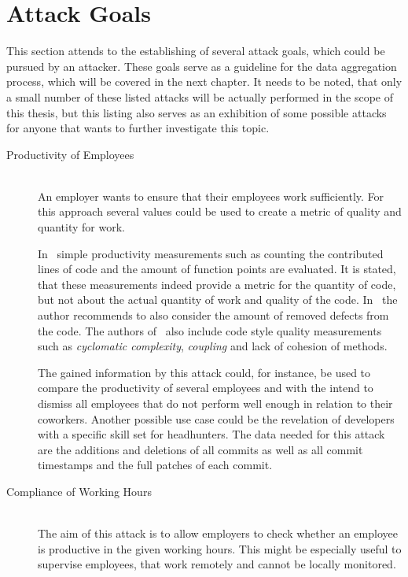 \section{Attack Goals}\label{attack-goals}
This section attends to the establishing of several attack goals, which could be pursued by an attacker.
These goals serve as a guideline for the data aggregation process, which will be covered in the next chapter.
It needs to be noted, that only a small number of these listed attacks will be actually performed in the scope of this thesis, but this listing also serves as an exhibition of some possible attacks for anyone that wants to further investigate this topic.

\begin{description}
    \item[Productivity of Employees] \hfill \\
        An employer wants to ensure that their employees work sufficiently.
        For this approach several values could be used to create a metric of quality and quantity for work.

        In~\cite[p.~3]{article:job-productivity} simple productivity measurements such as counting the contributed lines of code and the amount of function points are evaluated.
        It is stated, that these measurements indeed provide a metric for the quantity of code, but not about the actual quantity of work and quality of the code.
        In~\cite[p.~43]{article:measuring-programming-quality} the author recommends to also consider the amount of removed defects from the code.
        The authors of~\cite[p.~257]{article:software-productivity} also include code style quality measurements such as \emph{cyclomatic complexity}, \emph{coupling} and lack of cohesion of methods.

        The gained information by this attack could, for instance, be used to compare the productivity of several employees and with the intend to dismiss all employees that do not perform well enough in relation to their coworkers.
        Another possible use case could be the revelation of developers with a specific skill set for headhunters.
        The data needed for this attack are the additions and deletions of all commits as well as all commit timestamps and the full patches of each commit.

    \item[Compliance of Working Hours] \hfill \\
        The aim of this attack is to allow employers to check whether an employee is productive in the given working hours.
        This might be especially useful to supervise employees, that work remotely and cannot be locally monitored.


\end{description}
